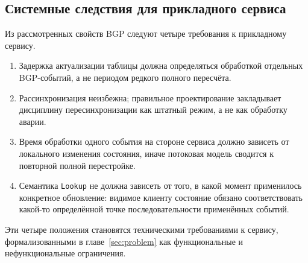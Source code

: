 \subsection{Системные следствия для прикладного сервиса}

Из рассмотренных свойств BGP следуют четыре требования к прикладному
сервису.

\begin{enumerate}
\item Задержка актуализации таблицы должна определяться обработкой
отдельных BGP-событий, а не периодом редкого полного пересчёта.
\item Рассинхронизация неизбежна; правильное проектирование закладывает
дисциплину пересинхронизации как штатный режим, а не как обработку
аварии.
\item Время обработки одного события на стороне сервиса должно зависеть
от локального изменения состояния, иначе потоковая модель сводится к
повторной полной перестройке.
\item Семантика \texttt{Lookup} не должна зависеть от того, в какой
момент применилось конкретное обновление: видимое клиенту состояние
обязано соответствовать какой-то определённой точке последовательности
применённых событий.
\end{enumerate}

Эти четыре положения становятся техническими требованиями к сервису,
формализованными в главе~\ref{sec:problem} как функциональные и
нефункциональные ограничения.

